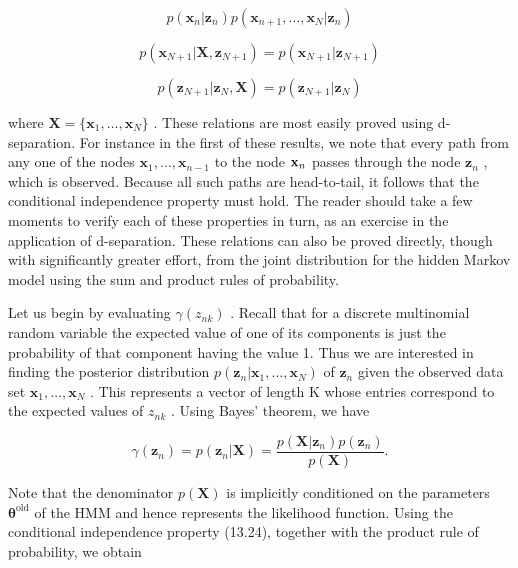 \documentclass[
  10
]{article}
\begin{document}
\[
p (\mathbf {x} _ {n} | \mathbf {z} _ {n}) p (\mathbf {x} _ {n + 1}, \ldots , \mathbf {x} _ {N} | \mathbf {z} _ {n})\tag{13.29}
\]

\[
{p (\mathbf {x} _ {N + 1} | \mathbf {X}, \mathbf {z} _ {N + 1})} = {p (\mathbf {x} _ {N + 1} | \mathbf {z} _ {N + 1})}\tag{13.30}
\]

\[
{p (\mathbf {z} _ {N + 1} | \mathbf {z} _ {N}, \mathbf {X})} = {p (\mathbf {z} _ {N + 1} | \mathbf {z} _ {N})}\tag{13.31}
\]

where
\(\mathbf { X } = \{ \mathbf { x } _ { 1 } , \ldots , \mathbf { x } _ { N } \}\)
. These relations are most easily proved using d-separation. For
instance in the first of these results, we note that every path from any
one of the nodes
\(\mathbf { x } _ { 1 } , \ldots , \mathbf { x } _ { n - 1 }\) to the
node \({ \bf x } _ { n }\) passes through the node
\(\mathbf { z } _ { n }\) , which is observed. Because all such paths
are head-to-tail, it follows that the conditional independence property
must hold. The reader should take a few moments to verify each of these
properties in turn, as an exercise in the application of d-separation.
These relations can also be proved directly, though with significantly
greater effort, from the joint distribution for the hidden Markov model
using the sum and product rules of probability.

Let us begin by evaluating \(\gamma ( z _ { n k } )\) . Recall that for
a discrete multinomial random variable the expected value of one of its
components is just the probability of that component having the value 1.
Thus we are interested in finding the posterior distribution
\(p ( \mathbf { z } _ { n } \vert \mathbf { x } _ { 1 } , \ldots , \mathbf { x } _ { N } )\)
of \(\mathbf { z } _ { n }\) given the observed data set
\(\mathbf { x } _ { 1 } , \ldots , \mathbf { x } _ { N }\) . This
represents a vector of length K whose entries correspond to the expected
values of \(z _ { n k }\) . Using Bayes' theorem, we have

\[
\gamma (\mathbf {z} _ {n}) = p (\mathbf {z} _ {n} | \mathbf {X}) = \frac {p (\mathbf {X} | \mathbf {z} _ {n}) p (\mathbf {z} _ {n})}{p (\mathbf {X})}.\tag{13.32}
\]

Note that the denominator \(p ( \mathbf { X } )\) is implicitly
conditioned on the parameters
\(\pmb { \theta } ^ { \mathrm { o l d } }\) of the HMM and hence
represents the likelihood function. Using the conditional independence
property (13.24), together with the product rule of probability, we
obtain
\end{document}
